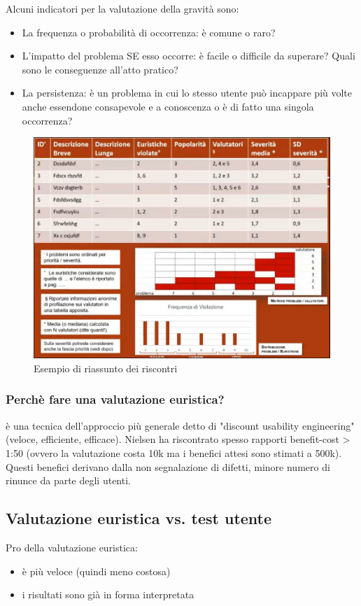 \documentclass[11pt,a4paper]{book}
\begin{document}
Alcuni indicatori per la valutazione della gravità sono:
\begin{itemize}
	\item La frequenza o probabilità di occorrenza: è comune o raro?
	\item L'impatto del problema SE esso occorre: è facile o difficile da superare? Quali sono le conseguenze all'atto pratico?
	\item La persistenza: è un problema in cui lo stesso utente può incappare più volte anche essendone consapevole e a conoscenza o è di fatto una singola occorrenza?
\end{itemize}

\begin{figure}[h!]
	\begin{center}
		\includegraphics[scale=0.6]{img/016.jpg}
		\caption{Esempio di riassunto dei riscontri}
		\label{fig: 016}
	\end{center}
\end{figure}

\subsubsection{Perchè fare una valutazione euristica?}
è una tecnica dell'approccio più generale detto di "discount usability engineering" (veloce, efficiente, efficace). Nielsen ha riscontrato spesso rapporti benefit-cost > 1:50 (ovvero la valutazione costa 10k ma i benefici attesi sono stimati a 500k). Questi benefici derivano dalla non segnalazione di difetti, minore numero di rinunce da parte degli utenti.

\subsection{Valutazione euristica vs. test utente}
Pro della valutazione euristica: 
\begin{itemize}
	\item è più veloce (quindi meno costosa)
	\item i risultati sono già in forma interpretata
\end{itemize}
\end{document}
